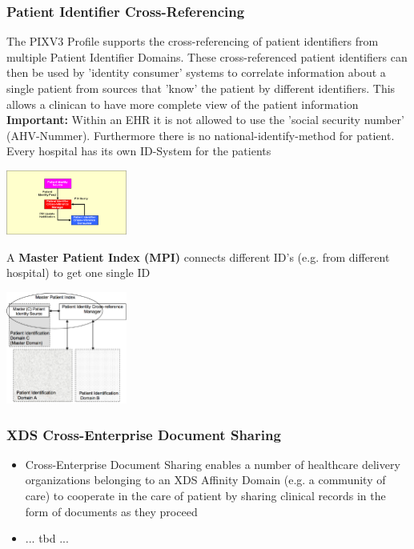 \documentclass{report}
\newenvironment{Figure}
	{\par\medskip\noindent\minipage{\linewidth}}
	{\endminipage\par\medskip}
\theoremstyle{definition}
\theoremstyle{example}
\begin{document}
\subsubsection{Patient Identifier Cross-Referencing}
The PIXV3 Profile supports the cross-referencing of patient identifiers from multiple Patient Identifier Domains. These cross-referenced patient identifiers can then be used by 'identity consumer' systems to correlate information
about a single patient from sources that 'know' the patient by different identifiers. This allows a clinican to have more complete view of the patient information\\

\textbf{Important:} Within an EHR it is not allowed to use the 'social security number' (AHV-Nummer). Furthermore there is no national-identify-method for patient. Every hospital has its own ID-System for the patients

\begin{Figure}
   \centering
    \includegraphics[width=150px]{img/PIX.png}
        \label{fig:Workflow from PIX}
\end{Figure}

A \textbf{Master Patient Index (MPI)} connects different ID's (e.g. from different hospital) to get one single ID
\begin{Figure}
   \centering
    \includegraphics[width=150px]{img/MPI.png}
        \label{fig:Workflow from MPI}
\end{Figure}

\subsubsection{XDS Cross-Enterprise Document Sharing}
\begin{itemize}
   \item Cross-Enterprise Document Sharing enables a number of healthcare delivery organizations belonging to an XDS Affinity Domain (e.g. a community of care) to cooperate in the care of patient by sharing clinical records in the form of documents as they proceed
   \item ... tbd ... 
\end{itemize}
\end{document}
